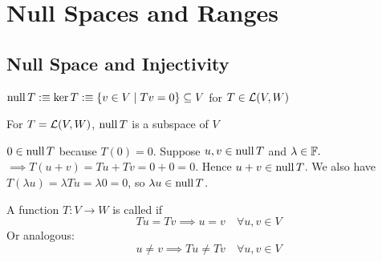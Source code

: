 \section{Null Spaces and Ranges}

\subsection{Null Space and Injectivity}

\begin{mydef} 
  $\operatorname{null} T :\equiv \ker T :\equiv \{ v \in V \mid Tv=0\} \subseteq V$ for $T \in {\mathcal{L}(V,W)}$
\end{mydef}

\setcounter{thm}{12}
\begin{thm} 
  \label{thm: null space is a subspace}
  For $T=\mathcal{L}(V, W)$, $\operatorname{null} T$ is a subspace of $V$
\end{thm}
\begin{prf}
  $0 \in \operatorname{null} T$ because $T(0) = 0$. Suppose $u,v \in \operatorname{null} T$ and $\lambda \in \mathbb{F}.$ $\implies T(u+v)=Tu+Tv=0+0=0.$ Hence $u+v \in \operatorname{null} T$. We also have $T(\lambda u)= \lambda Tu = \lambda 0 = 0$, so $\lambda u \in \operatorname{null} T$.
\end{prf}

\setcounter{thm}{13}
\begin{mydef} [injectivity]
  \label{def: injectivity}
  A function $T: V \to W$ is called  if
  \begin{equation}
    Tu = Tv \implies u = v \quad \forall u,v \in V
  \end{equation}
  Or analogous:
  \begin{equation}
    u \neq v \implies Tu \neq Tv \quad \forall u,v \in V
  \end{equation}
\end{mydef}

